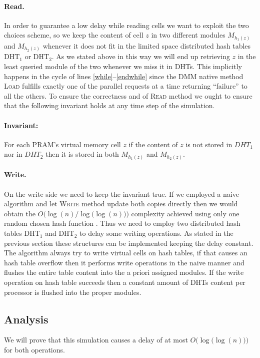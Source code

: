 \paragraph{{\bf Read}.} In order to guarantee
a low delay while reading cells we want to exploit the two choices scheme,
so we keep the content of cell $z$ in two different modules $M_{h_1(z)}$ and
$M_{h_2(z)}$ whenever it does not fit in the limited space distributed hash tables DHT$_1$ or DHT$_2$. As we stated above in this way we will end up
retrieving $z$ in the least queried
module of the two whenever we miss it in DHTs. This implicitly happens in the cycle of lines
\ref{while}--\ref{endwhile} since
the DMM native method \textsc{Load} fulfills exactly one of the parallel requests at
a time returning ``failure'' to all the others. To ensure the correctness and
of \textsc{Read} method we ought to ensure that the following invariant holds
at any time step of the simulation.
\paragraph{Invariant:} For each PRAM's virtual memory cell $z$ if the content of
$z$ is not stored in $DHT_1$ nor in $DHT_2$ then it is stored in both
$M_{h_1(z)}$ and $M_{h_2(z)}$.

\paragraph{{\bf Write}.}On the write side we need to keep the invariant true.
If we employed a naive algorithm and let \textsc{Write}
method update
both copies directly then we would obtain the $O\bigl(\log(n)\bigr / \log\bigl(\log(n)\bigr)\big)$ complexity achieved using only
one random chosen hash function \cite{art}. Thus we need to employ two
distributed hash tables DHT$_1$ and DHT$_2$ to delay some writing operations.
As stated in the previous section these structures can be implemented keeping
the delay constant.
The algorithm always try to write virtual cells on hash tables, if that causes
an hash table overflow then it performs write operations in the naive manner
and flushes the entire table content into the a priori assigned modules.
If the write operation on hash table succeeds then a constant amount of
DHTs content per processor is flushed into the proper modules.

\subsection{Analysis}
We will prove that this simulation causes a delay of at most $O\bigl(\log\bigl(\log(n)\bigl)\bigl)$ for both operations.

